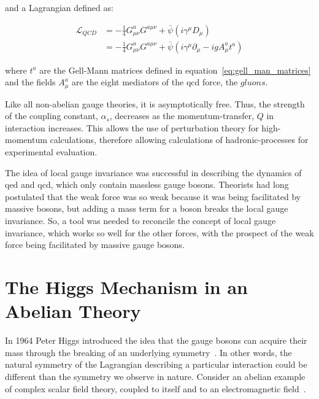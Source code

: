 \noindent and a Lagrangian defined as:

\begin{equation}\label{eq:qcd_lagrangian}
\begin{aligned}
\mathcal{L}_{QCD} & = -\frac{1}{4}G_{\mu\nu}^{a}G^{a\mu\nu} +
\bar{\psi}(i\gamma^{\mu}D_{\mu}) \\
 & = -\frac{1}{4}G_{\mu\nu}^{a}G^{a\mu\nu} +
\bar{\psi}(i\gamma^{\mu}\partial_{\mu}-igA_{\mu}^{a}t^{a})
\end{aligned}
\end{equation}

\noindent where $t^{a}$ are the Gell-Mann matrices defined in
equation~\ref{eq:gell_man_matrices} and the fields $A_{\mu}^{a}$ are
the eight mediators of the \acrshort{qcd} force, the $gluons$.  

\par Like all non-abelian gauge theories, it is asymptotically
free.  Thus, the strength of the coupling constant,
$\alpha_{s}$, decreases as the momentum-transfer, $Q$ in interaction
increases.  This allows the use of perturbation theory for
high-momentum calculations, therefore allowing calculations of
hadronic-processes for experimental evaluation.    

\par The idea of local gauge invariance was successful in describing
the dynamics of \acrshort{qed} and \acrshort{qcd}, which only contain
massless gauge bosons. Theorists had long postulated that
the weak force was so weak because it was being facilitated by massive
bosons, but adding a mass term for a boson breaks the local gauge
invariance.  So, a tool was needed to reconcile the concept of local gauge
invariance, which works so well for the other forces, with the
prospect of the weak force being facilitated by massive gauge bosons.


\section{The Higgs Mechanism in an Abelian Theory}
\label{abelian_higgs_mechanism_overview}

\par In 1964 Peter Higgs introduced the idea that the gauge bosons
can acquire their mass through the breaking of an underlying
symmetry~\cite{th:Higgs_BrokenSymmetries}. In other words, the natural
symmetry of the Lagrangian describing a particular interaction could
be different than the symmetry we observe in nature.  Consider an
abelian example of complex scalar field theory, coupled to itself and
to an electromagnetic field~\cite{Peskin_Schroeder}. 

